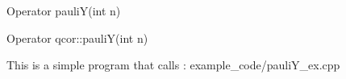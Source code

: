 
\begin{apidefinition}

\begin{Csynopsis}
    Operator pauliY(int n)
\end{Csynopsis}

\begin{Cppsynopsis}
    Operator qcor::pauliY(int n)
\end{Cppsynopsis}


\begin{apiarguments}
\end{apiarguments}



\apinotes{
    
}

\begin{apiexamples}

\apicppexample
    { This is a simple program that calls : } 
    { example_code/pauliY_ex.cpp} 
    {}

\end{apiexamples}

\end{apidefinition}
